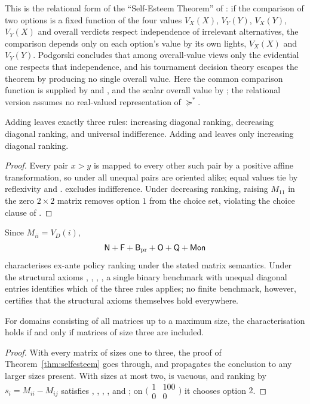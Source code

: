 This is the relational form of the \enquote{Self-Esteem Theorem} of \textcite{podgorski2022}: if
the comparison of two options is a fixed function of the four values $V_X(X)$, $V_Y(Y)$, $V_X(Y)$,
$V_Y(X)$ and overall verdicts respect independence of irrelevant alternatives, the comparison
depends only on each option's value by its own lights, $V_X(X)$ and $V_Y(Y)$. Podgorski concludes
that among overall-value views only the evidential one respects that independence, and his
tournament decision theory escapes the theorem by producing no single overall value. Here the
common comparison function is supplied by  and \Bpr, and the scalar overall value by ;
the relational version assumes no real-valued representation of $\succeq^*$.

\begin{corollary}\label{cor:three}
Adding  leaves exactly three rules: increasing diagonal ranking, decreasing diagonal ranking,
and universal indifference. Adding  and \Mon{} leaves only increasing diagonal ranking.
\end{corollary}

\begin{proof}
Every pair $x>y$ is mapped to every other such pair by a positive affine transformation, so under 
all unequal pairs are oriented alike; equal values tie by reflexivity and .  excludes
indifference. Under decreasing ranking, raising $M_{11}$ in the zero $2\times2$ matrix removes option $1$
from the choice set, violating the choice clause of \Mon.
\end{proof}

Since $M_{ii}=V_D(i)$,
\[
  \textup{\textsf{N}}+\textup{\textsf{F}}+\textup{\textsf{B}}_{\mathrm{pr}}+\textup{\textsf{O}}+\textup{\textsf{Q}}+\textup{\textsf{Mon}}
\]
characterises ex-ante policy ranking under the stated matrix semantics. Under the structural axioms
, , \Bpr, , a single binary benchmark with unequal diagonal entries identifies which of the
three rules applies; no finite benchmark, however, certifies that the structural axioms themselves
hold everywhere.

\begin{proposition}\label{prop:threshold}
For domains consisting of all matrices up to a maximum size, the characterisation holds if and only if
matrices of size three are included.
\end{proposition}

\begin{proof}
With every matrix of sizes one to three, the proof of Theorem~\ref{thm:selfesteem} goes through, and
\Bpr{} propagates the conclusion to any larger sizes present. With sizes at most two, \Bpr{} is vacuous,
and ranking by $s_i=M_{ii}-M_{ij}$ satisfies , , , , and \Mon; on
$\bigl(\begin{smallmatrix}1&100\\0&0\end{smallmatrix}\bigr)$ it chooses option $2$.
\end{proof}

